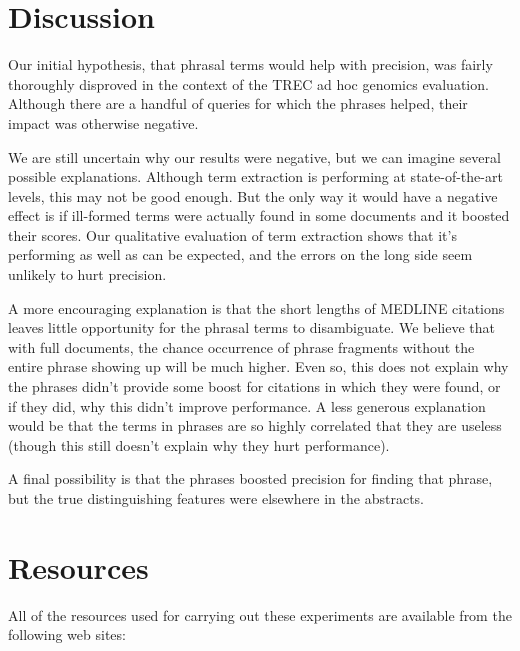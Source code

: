 \documentclass[11pt,oneside]{article}
\begin{document}
\section*{Discussion}

Our initial hypothesis, that phrasal terms would help with precision,
was fairly thoroughly disproved in the context of the TREC ad hoc
genomics evaluation.  Although there are a handful of queries for
which the phrases helped, their impact was otherwise negative.  

We are still uncertain why our results were negative, but we can
imagine several possible explanations.  Although term extraction is
performing at state-of-the-art levels, this may not be good enough.
But the only way it would have a negative effect is if ill-formed
terms were actually found in some documents and it boosted their
scores.  Our qualitative evaluation of term extraction shows that it's
performing as well as can be expected, and the errors on the long
side seem unlikely to hurt precision.

A more encouraging explanation is that the short lengths of MEDLINE
citations leaves little opportunity for the phrasal terms to
disambiguate.  We believe that with full documents, the chance
occurrence of phrase fragments without the entire phrase showing up
will be much higher.  Even so, this does not explain why the phrases
didn't provide some boost for citations in which they were found, or
if they did, why this didn't improve performance.  A less generous
explanation would be that the terms in phrases are so highly
correlated that they are useless (though this still doesn't explain
why they hurt performance).

A final possibility is that the phrases boosted precision for finding
that phrase, but the true distinguishing features were elsewhere in
the abstracts.



\section*{Resources}

All of the resources used for carrying out these experiments are
available from the following web sites:
\\
\end{document}
